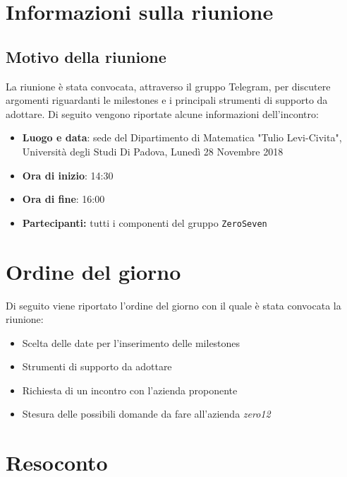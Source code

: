 \documentclass[a4paper,12pt]{article}
\begin{document}
	\cleardoublepage
	\pagestyle{mymain}
	
	\tableofcontents
	\cleardoublepage
	
	\section{Informazioni sulla riunione}
	\subsection{Motivo della riunione}
	La riunione è stata convocata, attraverso il gruppo Telegram, per discutere argomenti riguardanti le milestones e i principali strumenti di supporto da adottare.
	Di seguito vengono riportate alcune informazioni dell'incontro:
	\begin{itemize}
		\item \textbf{Luogo e data}: sede del Dipartimento di Matematica "Tulio Levi-Civita", Università degli Studi Di Padova, Lunedì 28 Novembre 2018
		\item \textbf{Ora di inizio}: 14:30
		\item \textbf{Ora di fine}: 16:00
		\item \textbf{Partecipanti: } tutti i componenti del gruppo \texttt{ZeroSeven} 
	\end{itemize}
	\section{Ordine del giorno}
	Di seguito viene riportato l'ordine del giorno con il quale è stata convocata la riunione:
	\begin{itemize}
		\item Scelta delle date per l'inserimento delle milestones
		\item Strumenti di supporto da adottare
		\item Richiesta di un incontro con l'azienda proponente
		\item Stesura delle possibili domande da fare all'azienda \textit{zero12}
	\end{itemize}
	\section{Resoconto}
\end{document}
